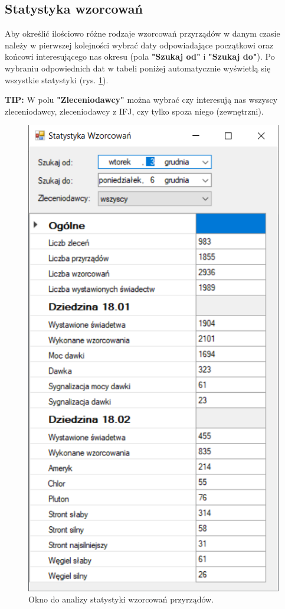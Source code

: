 \subsection{Statystyka wzorcowań}
\label{stat_wzor}

Aby określić ilościowo różne rodzaje wzorcowań przyrządów w danym czasie należy w pierwszej kolejności wybrać daty odpowiadające początkowi oraz końcowi interesującego nas okresu (pola \textbf{"Szukaj od"} i \textbf{"Szukaj do"}). Po wybraniu odpowiednich dat w tabeli poniżej automatycznie wyświetlą się wszystkie statystyki (rys. \ref{statystykaWzorcowan}).

\textbf{TIP:} W polu \textbf{"Zleceniodawcy"} można wybrać czy interesują nas wszyscy zleceniodawcy, zleceniodawcy z IFJ, czy tylko spoza niego (zewnętrzni).

\begin{figure}[htb]
	\centering
	\includegraphics{obrazki/Wyszukiwanie/statystyka_wzorcowan.png}
	\caption{Okno do analizy statystyki wzorcowań przyrządów.}
	\label{statystykaWzorcowan}
\end{figure}

